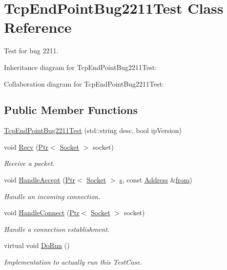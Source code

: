 \hypertarget{classTcpEndPointBug2211Test}{}\section{Tcp\+End\+Point\+Bug2211\+Test Class Reference}
\label{classTcpEndPointBug2211Test}


Test for bug 2211.  




Inheritance diagram for Tcp\+End\+Point\+Bug2211\+Test\+:


Collaboration diagram for Tcp\+End\+Point\+Bug2211\+Test\+:
\subsection*{Public Member Functions}
\begin{DoxyCompactItemize}
\item 
\hyperlink{classTcpEndPointBug2211Test_affa1a464857e3330b29a5d4a3aa47d64}{Tcp\+End\+Point\+Bug2211\+Test} (std\+::string desc, bool ip\+Version)
\item 
void \hyperlink{classTcpEndPointBug2211Test_a6bc32c2507ff250acf8e93079408e0ed}{Recv} (\hyperlink{classns3_1_1Ptr}{Ptr}$<$ \hyperlink{classns3_1_1Socket}{Socket} $>$ socket)
\begin{DoxyCompactList}\small\item\em Receive a packet. \end{DoxyCompactList}\item 
void \hyperlink{classTcpEndPointBug2211Test_adfcd92c55b5489fa47ff231803b7d940}{Handle\+Accept} (\hyperlink{classns3_1_1Ptr}{Ptr}$<$ \hyperlink{classns3_1_1Socket}{Socket} $>$ \hyperlink{generate__test__data__lte__sinr_8m_ad83eeb3a142285d1243a08c6b7026df8}{s}, const \hyperlink{classns3_1_1Address}{Address} \&\hyperlink{lte__amc_8m_a1b4c81ff74eb1a626b5ade44c81004b3}{from})
\begin{DoxyCompactList}\small\item\em Handle an incoming connection. \end{DoxyCompactList}\item 
void \hyperlink{classTcpEndPointBug2211Test_aeadec4cba94c55bd4e9b47b21652cfb6}{Handle\+Connect} (\hyperlink{classns3_1_1Ptr}{Ptr}$<$ \hyperlink{classns3_1_1Socket}{Socket} $>$ socket)
\begin{DoxyCompactList}\small\item\em Handle a connection establishment. \end{DoxyCompactList}\item 
virtual void \hyperlink{classTcpEndPointBug2211Test_ab0f069f68fbb6b3e69a42e090be8215c}{Do\+Run} ()
\begin{DoxyCompactList}\small\item\em Implementation to actually run this Test\+Case. \end{DoxyCompactList}\end{DoxyCompactItemize}

